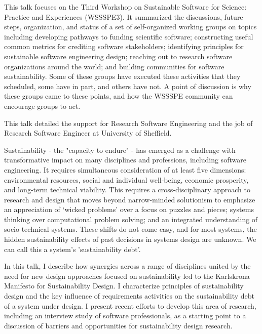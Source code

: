 \documentclass[a4paper,UKenglish]{dagrep}
\begin{document}
This talk focuses on the Third Workshop on Sustainable Software for Science: Practice and Experiences (WSSSPE3). It summarized the discussions, future steps, organization, and status of a set of self-organized working groups on topics including developing pathways to funding scientific software; constructing useful common metrics for crediting software stakeholders; identifying principles for sustainable software engineering design; reaching out to research software organizations around the world; and building communities for software sustainability. Some of these groups have executed these activities that they scheduled, some have in part, and others have not.  A point of discussion is why these groups came to these points, and how the WSSSPE community can encourage groups to act.


This talk detailed the support for Research Software Engineering and the job of Research Software Engineer at University of Sheffield. 


Sustainability - the "capacity to endure" - has emerged as a challenge with transformative impact on many disciplines and professions, including software engineering. It requires simultaneous consideration of at least five dimensions: environmental resources, social and individual well-being, economic prosperity, and long-term technical viability. This requires a cross-disciplinary approach to research and design that moves beyond narrow-minded solutionism to emphasize an appreciation of ‘wicked problems’ over a focus on puzzles and pieces; systems thinking over computational problem solving; and an integrated understanding of socio-technical systems. These shifts do not come easy, and for most systems, the hidden sustainability effects of past decisions in systems design are unknown. We can call this a system's 'sustainability debt'.

In this talk, I describe how synergies across a range of disciplines united by the need for new design approaches focused on sustainability led to the Karlskrona Manifesto for Sustainability Design. I characterize principles of sustainability design and the key influence of requirements activities on the sustainability debt of a system under design. I present recent efforts to develop this area of research, including an interview study of software professionals, as a starting point to a discussion of barriers and opportunities for sustainability design research.
\end{document}
